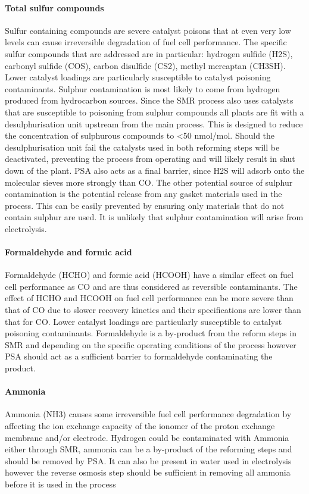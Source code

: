 \paragraph{Total sulfur compounds}
Sulfur containing compounds are severe catalyst poisons that at even very low levels can cause irreversible degradation of fuel cell performance. The specific sulfur compounds that are addressed are in particular: hydrogen sulfide (H2S), carbonyl sulfide (COS), carbon disulfide (CS2), methyl mercaptan (CH3SH). Lower catalyst loadings are particularly susceptible to catalyst poisoning contaminants.
Sulphur contamination is most likely to come from hydrogen produced from hydrocarbon sources. Since the SMR process also uses catalysts that are susceptible to poisoning from sulphur compounds all plants are fit with a desulphurisation unit upstream from the main process. This is designed to reduce the concentration of sulphurous compounds to <50 nmol/mol. Should the desulphurisation unit fail the catalysts used in both reforming steps will be deactivated, preventing the process from operating and will likely result in shut down of the plant. PSA also acts as a final barrier, since H2S will adsorb onto the molecular sieves more strongly than CO.
The other potential source of sulphur contamination is the potential release from any gasket materials used in the process. This can be easily prevented by ensuring only materials that do not contain sulphur are used. 
It is unlikely that sulphur contamination will arise from electrolysis. 

\paragraph{Formaldehyde and formic acid}
Formaldehyde (HCHO) and formic acid (HCOOH) have a similar effect on fuel cell performance as CO and are thus considered as reversible contaminants. The effect of HCHO and HCOOH on fuel cell performance can be more severe than that of CO due to slower recovery kinetics and their specifications are lower than that for CO. Lower catalyst loadings are particularly susceptible to catalyst poisoning contaminants.
Formaldehyde is a by-product from the reform steps in SMR and depending on the specific operating conditions of the process however PSA should act as a sufficient barrier to formaldehyde contaminating the product.
\paragraph{Ammonia}
Ammonia (NH3) causes some irreversible fuel cell performance degradation by affecting the ion exchange capacity of the ionomer of the proton exchange membrane and/or electrode.
Hydrogen could be contaminated with Ammonia either through SMR, ammonia can be a by-product of the reforming steps and should be removed by PSA. It can also be present in water used in electrolysis however the reverse osmosis step should be sufficient in removing all ammonia before it is used in the process 

